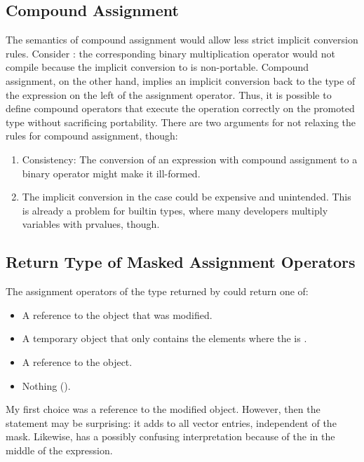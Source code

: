 \subsection{Compound Assignment}
The semantics of compound assignment would allow less strict implicit conversion rules.
Consider : the corresponding binary multiplication operator would not compile because the implicit conversion to \datapar[<double>] is non-portable.
Compound assignment, on the other hand, implies an implicit conversion back to the type of the expression on the left of the assignment operator.
Thus, it is possible to define compound operators that execute the operation correctly on the promoted type without sacrificing portability.
There are two arguments for not relaxing the rules for compound assignment, though:
\begin{enumerate}
  \item Consistency: The conversion of an expression with compound assignment to a binary operator might make it ill-formed.
  \item The implicit conversion in the  case could be expensive and unintended.
    This is already a problem for builtin types, where many developers multiply \float variables with \double prvalues, though.
\end{enumerate}

\subsection{Return Type of Masked Assignment Operators}
The assignment operators of the type returned by  could return one of:
\begin{itemize}
  \item A reference to the \datapar object that was modified.
  \item A temporary \datapar object that only contains the elements where the \mask is \true.
  \item A reference to the  object.
  \item Nothing (\ie \void).
\end{itemize}
My first choice was a reference to the modified \datapar object.
However, then the statement  may be surprising: it adds  to all vector entries, independent of the mask.
Likewise,  has a possibly confusing interpretation because of the \mask in the middle of the expression.

